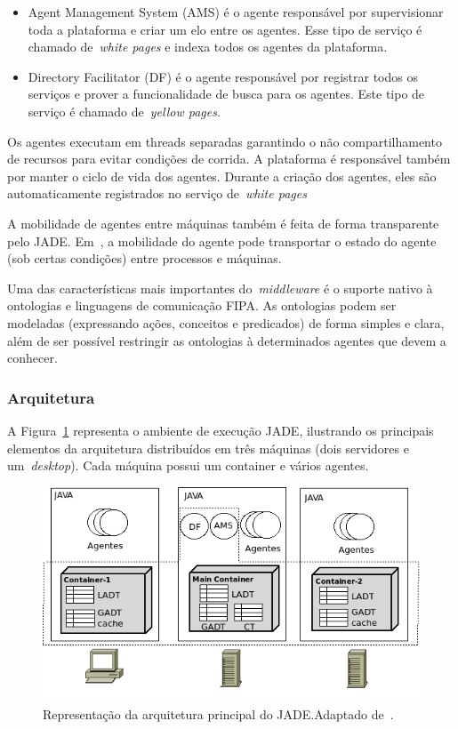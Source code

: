 \begin{itemize}
	\item Agent Management System (AMS) é o agente responsável por supervisionar toda a plataforma e criar um elo entre os agentes. Esse tipo de serviço é chamado de~\emph{white pages} e indexa todos os agentes da plataforma.
	\item Directory Facilitator (DF) é o agente responsável por registrar todos os serviços e prover a funcionalidade de busca para os agentes. Este tipo de serviço é chamado de~\emph{yellow pages}.
\end{itemize}

Os agentes executam em threads separadas garantindo o não compartilhamento de recursos para evitar condições de corrida. A plataforma é responsável também por manter o ciclo de vida dos agentes. Durante a criação dos agentes, eles são automaticamente registrados no serviço de~\emph{white pages}

A mobilidade de agentes entre máquinas também é feita de forma transparente pelo JADE. Em~\cite{bellifemine07}, a mobilidade do agente pode transportar o estado do agente (sob certas condições) entre processos e máquinas.

Uma das características mais importantes do~\emph{middleware} é o suporte nativo à ontologias e linguagens de comunicação FIPA. As ontologias podem ser modeladas (expressando ações, conceitos e predicados) de forma simples e clara, além de ser possível restringir as ontologias à determinados agentes que devem a conhecer.

\subsubsection{Arquitetura}

A Figura~\ref{fig:arquitetura-jade} representa o ambiente de execução JADE, ilustrando os principais elementos da arquitetura distribuídos em três máquinas (dois servidores e um~\emph{desktop}). Cada máquina possui um container e vários agentes.

\begin{figure}
	\centering
	\includegraphics[scale=0.65]{images/arquitetura-jade.png}
	\caption{Representação da arquitetura principal do JADE.Adaptado de~\cite{bellifemine07}.}
	\label{fig:arquitetura-jade}
\end{figure}

